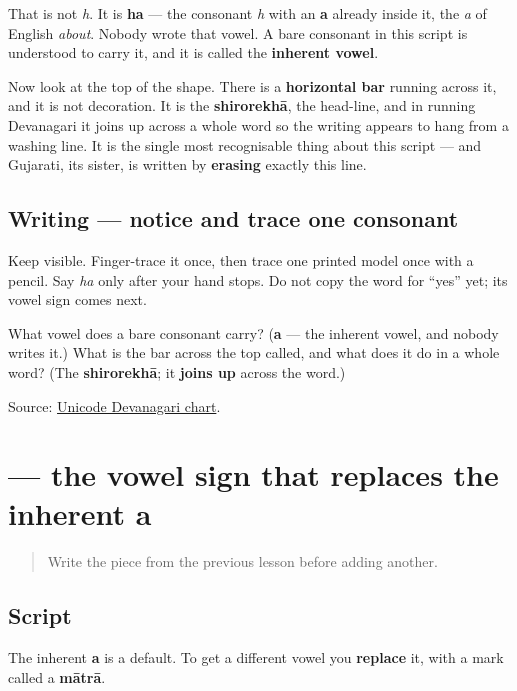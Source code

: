 That is not \emph{h}. It is \textbf{ha} — the consonant \emph{h} with an \textbf{a} already inside it, the \emph{a} of English \emph{about}. Nobody wrote that vowel. A bare consonant in this script is understood to carry it, and it is called the \textbf{inherent vowel}.

Now look at the top of the shape. There is a \textbf{horizontal bar} running across it, and it is not decoration. It is the \textbf{shirorekhā}, the head-line, and in running Devanagari it joins up across a whole word so the writing appears to hang from a washing line. It is the single most recognisable thing about this script — and Gujarati, its sister, is written by \textbf{erasing} exactly this line.

\subsection*{Writing — notice and trace one consonant}
Keep \textbf{} visible. Finger-trace it once, then trace one printed model once with a pencil. Say \emph{ha} only after your hand stops. Do not copy the word for \textquotedblleft{}yes\textquotedblright{} yet; its vowel sign comes next.

\begin{tcolorbox}[breakable,colback=teal!4,colframe=teal!35!black,title={Before you move on}]
What vowel does a bare consonant carry? (\textbf{a} — the inherent vowel, and nobody writes it.) What is the bar across the top called, and what does it do in a whole word? (The \textbf{shirorekhā}; it \textbf{joins up} across the word.)

Source: \href{https://www.unicode.org/charts/PDF/U0900.pdf}{Unicode Devanagari chart}.
\end{tcolorbox}
\section[-o]{ — the vowel sign that replaces the inherent a}

\label{lesson:MR-W01-o-matra}



\begin{quote}
Write the piece from the previous lesson before adding another.
\end{quote}

\subsection*{Script}
The inherent \textbf{a} is a default. To get a different vowel you \textbf{replace} it, with a mark called a \textbf{mātrā}.

